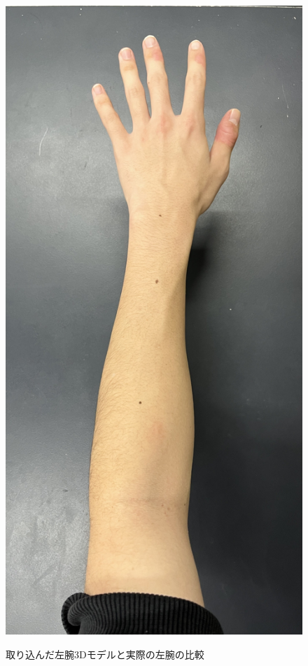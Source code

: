 \documentclass{ltjsreport}
\begin{document}
\begin{figure}[H]
\begin{minipage}{0.11\columnwidth}
		\label{fig:importLeftArm}
		\end{minipage}
		\hspace{0.04\columnwidth}
		\begin{minipage}{0.2\columnwidth}
		\centering
		\includegraphics[width = \columnwidth]{../figs/IMG_5145.jpg}
		\label{fig:realLeftArm}
		\vspace{0.12\columnwidth}
		\end{minipage}
		\caption{取り込んだ左腕3Dモデルと実際の左腕の比較}
		\label{fig:hikaku}
		\end{figure}
\end{document}
